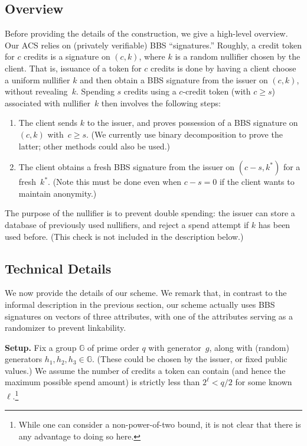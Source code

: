 \documentclass[11pt]{article}
\def\G{{\mathbb G}}
\begin{document}
\subsection{Overview}
Before providing the details of the construction, we give a high-level overview.
Our ACS relies on (privately verifiable) BBS ``signatures.''  
Roughly, a credit token for $c$ credits is a signature on $(c, k)$, where $k$ is a random nullifier chosen by the client. That is, issuance of a token for $c$ credits is done by having a client choose a uniform nullifier $k$ and then obtain a BBS signature from the issuer on $(c, k)$, without revealing~$k$.
Spending $s$ credits using a $c$-credit token (with $c \geq s$) associated with nullifier~$k$ then involves the following steps:
\begin{enumerate}
    \item The client sends $k$ to the issuer, and proves possession of a BBS signature on $(c, k)$ with~$c \geq s$. (We currently use binary decomposition to prove the latter; other methods could also be used.)
    \item The client obtains a fresh BBS signature from the issuer on $(c-s, k^*)$ for a fresh~$k^*$. (Note this must be done even when $c-s=0$ if the client wants to maintain anonymity.)
\end{enumerate}
The purpose of the nullifier is to prevent double spending: the issuer can store a database of previously used nullifiers, and reject a spend attempt if $k$ has been used before. (This check is not included in the description below.)

\subsection{Technical Details}
We now provide the details of our scheme. We remark that, in contrast to the informal description in the previous section, our scheme actually uses BBS signatures on vectors of three attributes, with one of the attributes serving as a randomizer to prevent linkability.

\medskip\noindent
{\bf Setup.}
Fix a group $\G$ of prime order $q$ with generator~$g$, along with
(random) generators $h_1, h_2, h_3 \in \G$. (These could be chosen by the issuer, or fixed public values.) 
We assume the number of credits a token can contain (and hence the maximum possible spend amount) is strictly less than $2^\ell<q/2$ for some known~$\ell$.\footnote{While one can consider a non-power-of-two bound, it is not clear that there is any advantage to doing so here.}
\end{document}
